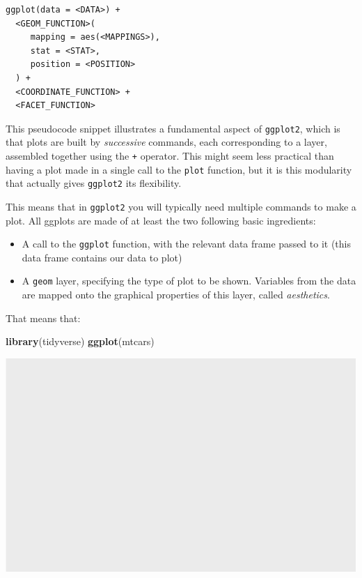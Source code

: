 \documentclass[]{book}
\newenvironment{Shaded}{}{}
\newcommand{\KeywordTok}[1]{\textcolor[rgb]{0.00,0.44,0.13}{\textbf{#1}}}
\newcommand{\NormalTok}[1]{#1}
\providecommand{\tightlist}{%
  \setlength{\itemsep}{0pt}\setlength{\parskip}{0pt}}
\begin{document}
\begin{verbatim}
ggplot(data = <DATA>) + 
  <GEOM_FUNCTION>(
     mapping = aes(<MAPPINGS>),
     stat = <STAT>, 
     position = <POSITION>
  ) +
  <COORDINATE_FUNCTION> +
  <FACET_FUNCTION>
\end{verbatim}

This pseudocode snippet illustrates a fundamental aspect of \texttt{ggplot2}, which is that plots are built by \emph{successive} commands, each corresponding to a layer, assembled together using the \texttt{+} operator. This might seem less practical than having a plot made in a single call to the \texttt{plot} function, but it is this modularity that actually gives \texttt{ggplot2} its flexibility.

This means that in \texttt{ggplot2} you will typically need multiple commands to make a plot. All ggplots are made of at least the two following basic ingredients:

\begin{itemize}
\tightlist
\item
  A call to the \texttt{ggplot} function, with the relevant data frame passed to it (this data frame contains our data to plot)
\item
  A \texttt{geom} layer, specifying the type of plot to be shown. Variables from the data are mapped onto the graphical properties of this layer, called \emph{aesthetics}.
\end{itemize}

That means that:

\begin{Shaded}
\begin{Highlighting}[]
\KeywordTok{library}\NormalTok{(tidyverse)}
\KeywordTok{ggplot}\NormalTok{(mtcars)}
\end{Highlighting}
\end{Shaded}

\begin{center}\includegraphics[width=\textwidth]{TRES-Tidy-Tutorial_files/figure-latex/unnamed-chunk-106-1} \end{center}
\end{document}
